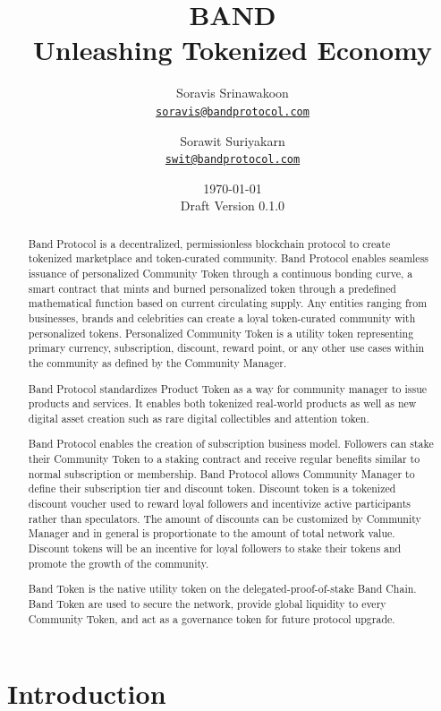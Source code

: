 \documentclass[letterpaper,11pt]{article}
\title{\LARGE BAND\\
    \Large Unleashing Tokenized Economy}
\author{
        Soravis Srinawakoon\\
        \small\href{mailto:soravis@bandprotocol.com}
            {\nolinkurl{soravis@bandprotocol.com}}
    \and
        Sorawit Suriyakarn\\
        \small\href{mailto:swit@bandprotocol.com}
            {\nolinkurl{swit@bandprotocol.com}}
    }
\date{\today\\\small Draft Version 0.1.0}
\begin{document}
\maketitle

\begin{abstract}

Band Protocol is a decentralized, permissionless blockchain protocol to create tokenized marketplace and token-curated community. Band Protocol enables seamless issuance of personalized Community Token through a continuous bonding curve, a smart contract that mints and burned personalized token through a predefined mathematical function based on current circulating supply. Any entities ranging from businesses, brands and celebrities can create a loyal token-curated community with personalized tokens. Personalized Community Token is a utility token representing primary currency, subscription, discount, reward point, or any other use cases within the community as defined by the Community Manager.

Band Protocol standardizes Product Token as a way for community manager to issue products and services. It enables both tokenized real-world products as well as new digital asset creation such as rare digital collectibles and attention token.

Band Protocol enables the creation of subscription business model. Followers can stake their Community Token to a staking contract and receive regular benefits similar to normal subscription or membership. Band Protocol allows Community Manager to define their subscription tier and discount token. Discount token is a tokenized discount voucher used to reward loyal followers and incentivize active participants rather than speculators. The amount of discounts can be customized by Community Manager and in general is proportionate to the amount of total network value. Discount tokens will be an incentive for loyal followers to stake their tokens and promote the growth of the community.

Band Token is the native utility token on the delegated-proof-of-stake Band Chain. Band Token are used to secure the network, provide global liquidity to every Community Token, and act as a governance token for future protocol upgrade.

\end{abstract}

\newpage
{
\hypersetup{linkcolor=black}
\tableofcontents
}
\newpage

\section{Introduction}
\end{document}
